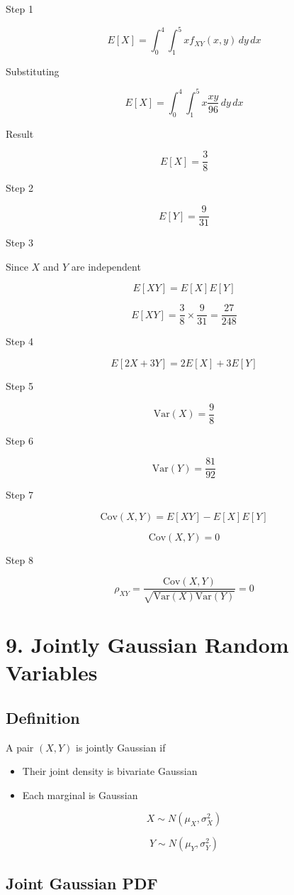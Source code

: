 \documentclass[12pt]{article}
\begin{document}
Step 1

\[
E[X]=\int_0^4 \int_1^5 x f_{XY}(x,y)\, dy\, dx
\]

Substituting

\[
E[X]=\int_0^4 \int_1^5 x\frac{xy}{96} \, dy\, dx
\]

Result

\[
E[X]=\frac{3}{8}
\]

Step 2

\[
E[Y]=\frac{9}{31}
\]

Step 3

Since $X$ and $Y$ are independent

\[
E[XY]=E[X]E[Y]
\]

\[
E[XY]=\frac{3}{8}\times\frac{9}{31}=\frac{27}{248}
\]

Step 4

\[
E[2X+3Y]=2E[X]+3E[Y]
\]

Step 5

\[
\text{Var}(X)=\frac{9}{8}
\]

Step 6

\[
\text{Var}(Y)=\frac{81}{92}
\]

Step 7

\[
\text{Cov}(X,Y)=E[XY]-E[X]E[Y]
\]

\[
\text{Cov}(X,Y)=0
\]

Step 8

\[
\rho_{XY}=\frac{\text{Cov}(X,Y)}{\sqrt{\text{Var}(X)\text{Var}(Y)}}=0
\]

\section*{9. Jointly Gaussian Random Variables}

\subsection*{Definition}

A pair $(X,Y)$ is jointly Gaussian if

\begin{itemize}
\item Their joint density is bivariate Gaussian
\item Each marginal is Gaussian
\end{itemize}

\[
X \sim N(\mu_X,\sigma_X^2)
\]

\[
Y \sim N(\mu_Y,\sigma_Y^2)
\]

\subsection*{Joint Gaussian PDF}
\end{document}
